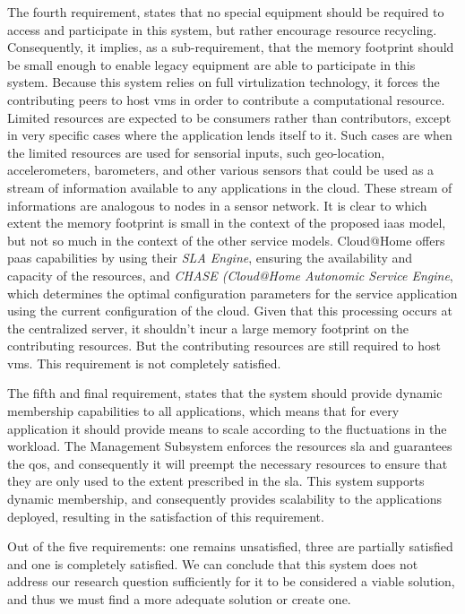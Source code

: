 \documentclass[12pt, titlepage]{uo_temp}
\begin{document}
     The fourth requirement, states that no special equipment should be required to access
     and participate in this system, but rather encourage resource
     recycling. Consequently, it implies, as a sub-requirement, that the memory footprint
     should be small enough to enable legacy equipment are able to participate in this
     system. Because this system relies on full virtulization technology, it forces the
     contributing peers to host \gls{vm}s in order to contribute a computational
     resource. Limited resources are expected to be consumers rather than contributors,
     except in very specific cases where the application lends itself to it. Such cases
     are when the limited resources are used for sensorial inputs, such geo-location,
     accelerometers, barometers, and other various sensors that could be used as a
     stream of information available to any applications in the cloud. These stream of
     informations are analogous to nodes in a sensor network. It is clear
     to which extent the memory footprint is small in the context of the proposed
     \gls{iaas} model, but not so much in the context of the other service
     models. Cloud@Home offers \gls{paas} capabilities by using their \emph{SLA Engine},
     ensuring the availability and capacity of the resources, and \emph{CHASE (Cloud@Home
       Autonomic Service Engine}, which determines the optimal configuration parameters
     for the service application using the current configuration of the cloud. Given that
     this processing occurs at the centralized server, it shouldn't incur a large memory
     footprint on the contributing resources. But the contributing resources are still
     required to host \gls{vm}s. This requirement is not completely satisfied.

     The fifth and final requirement, states that the system should provide dynamic
     membership capabilities to all applications, which means that for every application
     it should provide means to scale according to the fluctuations in the workload. The
     Management Subsystem enforces the resources \gls{sla} and guarantees the \gls{qos}, and 
     consequently it will preempt the necessary resources to ensure that they are
     only used to the extent prescribed in the \gls{sla}. This system supports
     dynamic membership, and consequently provides scalability to the applications
     deployed, resulting in the satisfaction of this requirement. 

     Out of the five requirements: one remains unsatisfied, three are partially satisfied
     and one is completely satisfied. We can conclude that this system does not address
     our research question sufficiently for it to be considered a viable solution, and
     thus we must find a more adequate solution or create one. 
\end{document}
